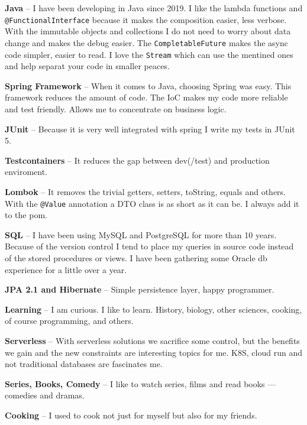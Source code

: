 \documentclass[9pt]{developercv} %
\begin{document}
\begin{minipage}[t]{0.49\textwidth}
    \vspace{-\baselineskip} %


    \textbf{Java} -- I have been developing in Java since 2019.
        I like the lambda functions and \texttt{@FunctionalInterface} because it makes the composition easier, less verbose.
        With the immutable objects and collections I do not need to worry about data change and makes the debug easier.
        The \texttt{CompletableFuture} makes the async code simpler, easier to read.
        I love the \texttt{Stream} which can use the mentined ones and help separat your code in smaller peaces.

    \textbf{Spring Framework} -- When it comes to Java, choosing Spring was easy.
    This framework reduces the amount of code. 
    The IoC makes my code more reliable and test friendly. Allows me to concentrate on business logic.

    \textbf{JUnit} -- Because it is very well integrated with spring I write my tests in JUnit 5.

    \textbf{Testcontainers} -- It reduces the gap between dev(/test) and production enviroment.

    \textbf{Lombok} -- It removes the trivial getters, setters, toString, equals and others. With the \texttt{@Value} annotation a DTO class is as short as it can be. I always add it to the pom.

    \textbf{SQL} -- I have been using MySQL and PostgreSQL for more than 10 years.
    Because of the version control I tend to place my queries in source code instead of the stored procedures or views. I have been gathering some Oracle db experience for a little over a year.

    \textbf{JPA 2.1 and Hibernate} -- Simple persistence layer, happy programmer.

\end{minipage}


\textbf{Learning} -- I am curious. I like to learn. History, biology, other sciences, cooking, of course programming, and others.

\textbf{Serverless} -- With serverless solutions we sacrifice some control, but the benefits we gain and the new constraints are interesting topics for me. K8S, cloud run and not traditional databases are fascinates me.

\textbf{Series, Books, Comedy} -- I like to watch series, films and read books — comedies and dramas.

\textbf{Cooking} -- I used to cook not just for myself but also for my friends.
\end{document}
